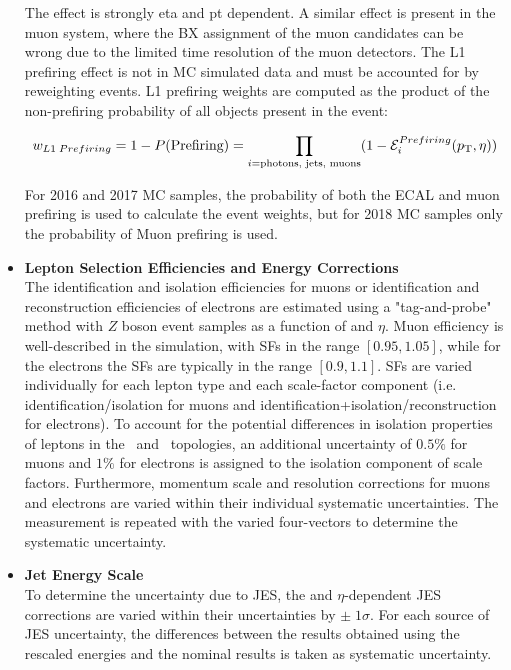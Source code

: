\begin{itemize}
    The effect is strongly eta and pt dependent.
    A similar effect is present in the muon system, where the BX assignment of the muon candidates can be wrong due to the limited time resolution of the muon detectors. 
    The L1 prefiring effect is not in MC simulated data and must be accounted for by reweighting events.
    L1 prefiring weights are computed as the product of the non-prefiring probability of all objects present in the event:
    \begin{linenomath*}
    \begin{align}
    w_{L1 \; Prefiring} = 1 - P(\text{Prefiring}) = \prod_{i=\text{photons, jets, muons}} (1 - \mathcal{E}_i^{Prefiring} (p_{\mathrm{T}},\eta))
    \end{align}
    \end{linenomath*}
    For 2016 and 2017 MC samples, the probability of both the ECAL and muon prefiring is used to calculate the event weights, but for 2018 MC samples only the probability of Muon prefiring is used.
    \item {\bf Lepton Selection Efficiencies and Energy Corrections} \\
    The identification and isolation efficiencies for muons or identification and reconstruction efficiencies of electrons are estimated using a "tag-and-probe" method with $Z$ boson event samples as a function of \pT and $\eta$. 
    Muon efficiency is well-described in the simulation, with SFs in the range $[0.95,1.05]$, while for the electrons the SFs are typically in the range $[0.9,1.1]$. 
    SFs are varied individually for each lepton type and each scale-factor component (i.e. identification/isolation for muons and identification+isolation/reconstruction for electrons). 
    To account for the potential differences in isolation properties of leptons in the \ttbar\ and \zjets\ topologies, an additional uncertainty of $0.5\%$ for muons and $1\%$ for electrons is assigned to the isolation component of scale factors.
    Furthermore, momentum scale and resolution corrections for muons and electrons are varied within their individual systematic uncertainties. 
    The measurement is repeated with the varied four-vectors to determine the systematic uncertainty.
    \item {\bf Jet Energy Scale} \\
    To determine the uncertainty due to JES, the \pT and $\eta$-dependent JES corrections are varied within their uncertainties by $\pm \; 1 \sigma$. 
    For each source of JES uncertainty, the differences between the results obtained using the rescaled energies and the nominal results is taken as systematic uncertainty. 

\end{itemize}
